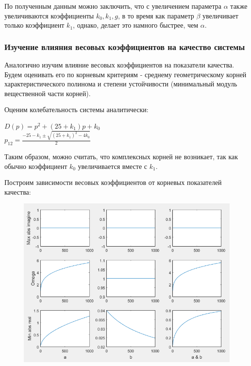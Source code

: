 \documentclass[14pt,a4paper,report]{report}
\begin{document}
По полученным данным можно заключить, что с увеличением параметра $\alpha$ также увеличиваются коэффициенты $k_0, k_1, g$, в то время как параметр $\beta$ увеличивает только коэффициент $k_1$, однако, делает это намного быстрее, чем $\alpha$.

\subsubsection{Изучение влияния весовых коэффициентов на качество системы}

Аналогично изучим влияние весовых коэффициентов на показатели качества. Будем оценивать его по корневым критериям - среднему геометрическому корней характеристического полинома и степени устойчивости (минимальный модуль вещественной части корней).

Оценим колебательность системы аналитически:

$D(p)=p^2+(25+k_1)p+k_0$\\

$p_{12}=\frac{-25-k_1\pm \sqrt{(25+k_1)^2-4k_0}}{2}$

Таким образом, можно считать, что комплексных корней не возникает, так как обычно коэффициент $k_0$ увеличивается вместе с $k_1$.

Построим зависимости весовых коэффициентов от корневых показателей качества:

\begin{figure}[h!]
	\centering
	\includegraphics[scale = 0.85]{images/2.png}
	\label{image:4}
\end{figure}
\end{document}

